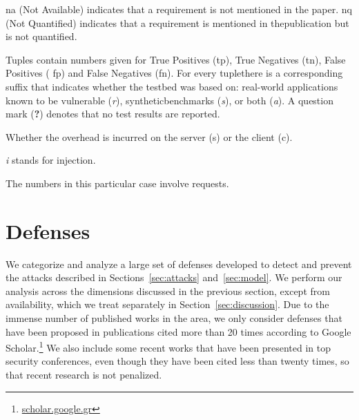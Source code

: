 \documentclass[10pt,journal,compsoc]{IEEEtran}
\begin{document}
\begin{table}[t]
\begin{threeparttable}
\begin{small}
\begin{tablenotes}
  \begin{footnotesize}
        \item[1] {\sc na} (Not Available) indicates that a requirement is not mentioned in the paper.
  {\sc nq} (Not Quantified) indicates that a requirement is mentioned in the\newline publication
  but is not quantified.
      \item[2] Tuples contain numbers given for True Positives
        ({\sc tp}), True Negatives ({\sc tn}), False Positives ({\sc
          fp}) and False Negatives ({\sc fn}). For every tuple\newline there is a corresponding suffix that indicates whether the testbed was
  based on: real-world applications known to be vulnerable ({\it r}),
  synthetic\newline benchmarks ({\it s}), or both ({\it a}).
  A question mark ({\bf ?}) denotes that no test results are reported.
    \item[3] Whether the overhead is incurred on the server ({\sc s}) or the client ({\sc c}). 
    \item[4] {\it i} stands for injection.
    \item[5] The numbers in this particular case involve requests.
  \end{footnotesize}
    \end{tablenotes}
    \end{small}
    \end{threeparttable}
\end{table}

\section{Defenses}
\label{sec:defs}

We categorize and analyze a large set of defenses developed to detect
and prevent
the attacks described in Sections~\ref{sec:attacks} and~\ref{sec:model}.
We perform our analysis across
the dimensions discussed in the previous section,
except from availability, which we treat
separately in Section~\ref{sec:discussion}.
Due to the immense number of published works in the area, we only consider
defenses that have been proposed in publications cited more than
20 times according to Google Scholar.\footnote{\scriptsize\url{scholar.google.gr}}
We also include some recent works that have been
presented in top security conferences, even though they have been
cited less than twenty times, so that recent research is not penalized.
\end{document}
